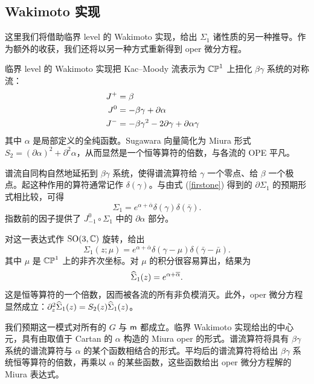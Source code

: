 \subsection{Wakimoto 实现}
这里我们将借助临界 level 的 Wakimoto 实现，给出 $\Sigma_1$ 诸性质的另一种推导。作为额外的收获，我们还将以另一种方式重新得到 oper 微分方程。

临界 level 的 Wakimoto 实现把 Kac--Moody 流表示为 ${\mathbb{CP}}^1$ 上扭化 $\beta\gamma$ 系统的对称流：
\begin{align}\label{waki}
J^+ &= \beta \cr
J^0 &= - \beta \gamma + \partial \alpha \cr
J^- &= -\beta \gamma^2 - 2 \partial \gamma + \partial \alpha \gamma \cr
\end{align}
其中 $\alpha$ 是局部定义的全纯函数。Sugawara 向量简化为 Miura 形式 $S_2 = (\partial\alpha)^2 + \partial^2 \alpha$，从而显然是一个恒等算符的倍数，与各流的 OPE 平凡。

谱流自同构自然地延拓到 $\beta\gamma$ 系统，使得谱流算符给 $\gamma$ 一个零点、给 $\beta$ 一个极点。起这种作用的算符通常记作 $\delta(\gamma)$。与由式 (\ref{firstone}) 得到的 $\partial \Sigma_1$ 的预期形式相比较，可得
\begin{equation}
\Sigma_1 = e^{\alpha+ \bar \alpha} \delta(\gamma)\delta(\bar \gamma).
\end{equation}
指数前的因子提供了 $J^0_{-1} \circ \Sigma_1$ 中的 $\partial \alpha$ 部分。

对这一表达式作 ${\mathrm{SO}}(3,{\mathbb C})$ 旋转，给出
\begin{equation}
\Sigma_1(z;\mu) = e^{\alpha+ \bar \alpha} \delta(\gamma -\mu)\delta(\bar \gamma- \bar \mu).
\end{equation}
其中 $\mu$ 是 ${\mathbb{CP}}^1$ 上的非齐次坐标。对 $\mu$ 的积分很容易算出，结果为
\begin{equation}
\widehat\Sigma_1(z) = e^{\alpha+ \overline \alpha} .
\end{equation}
这是恒等算符的一个倍数，因而被各流的所有非负模消灭。此外，oper 微分方程显然成立：$\partial_z^2 \widehat\Sigma_1(z) = S_2(z)\widehat\Sigma_1(z)$。

我们预期这一模式对所有的 $G$ 与 ${\sf m}$ 都成立。临界 Wakimoto 实现给出的中心元，具有由取值于 Cartan 的 $\alpha$ 构造的 Miura oper 的形式。谱流算符将具有 $\beta \gamma$ 系统的谱流算符与 $\alpha$ 的某个函数相结合的形式。平均后的谱流算符将给出 $\beta \gamma$ 系统恒等算符的倍数，再乘以 $\alpha$ 的某些函数，这些函数给出 oper 微分方程解的 Miura 表达式。

